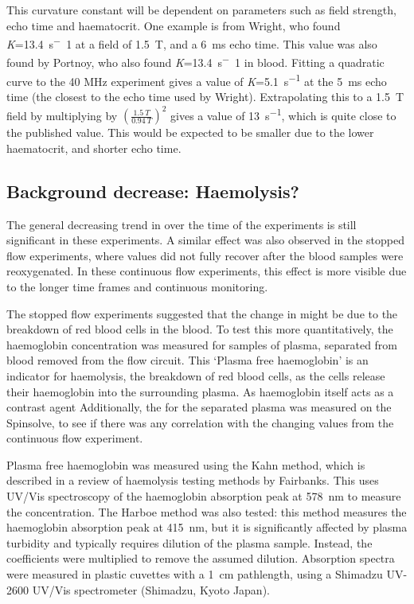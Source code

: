 This curvature constant will be dependent on parameters such as field strength, echo time and haematocrit.
One example is from Wright, who found \textit{K}=\SI{13.4}{s^-1} at a field of \SI{1.5}{T}, and a \SI{6}{ms} echo time\cite{WrightEstimatingoxygensaturation1991}.
This value was also found by Portnoy, who also found \textit{K}=\SI{13.4}{s^-1} in blood\cite{PortnoyRelaxationpropertieshuman2017}.
Fitting a quadratic curve to the 40 MHz experiment gives a value of \textit{K}=\SI{5.1}{s^{-1}} at the \SI{5}{ms} echo time (the closest to the echo time used by Wright).
Extrapolating this to a \SI{1.5}{T} field by multiplying by $(\frac{\SI{1.5}{T}}{\SI{0.94}{T}})^2$ gives a value of \SI{13}{s^{-1}}, which is quite close to the published value.
This would be expected to be smaller due to the lower haematocrit, and shorter echo time.


\subsection{Background \Ttwo decrease: Haemolysis?}

The general decreasing trend in \Ttwo over the time of the experiments is still significant in these experiments.
A similar effect was also observed in the stopped flow experiments, where \Ttwo values did not fully recover after the blood samples were reoxygenated.
In these continuous flow experiments, this effect is more visible due to the longer time frames and continuous monitoring.

The stopped flow experiments suggested that the change in \Ttwo might be due to the breakdown of red blood cells in the blood.
To test this more quantitatively, the haemoglobin concentration was measured for samples of plasma, separated from blood removed from the flow circuit.
This `Plasma free haemoglobin' is an indicator for haemolysis, the breakdown of red blood cells, as the cells release their haemoglobin into the surrounding plasma.
As haemoglobin itself acts as a contrast agent
Additionally, the \Ttwo for the separated plasma was measured on the Spinsolve, to see if there was any correlation with the changing \Ttwo values from the continuous flow experiment.

Plasma free haemoglobin was measured using the Kahn method, which is described in a review of haemolysis testing methods by Fairbanks\cite{FairbanksMethodsmeasuringplasma1992}.
This uses UV/Vis spectroscopy of the haemoglobin absorption peak at \SI{578}{nm} to measure the concentration.
The Harboe method was also tested: this method measures the haemoglobin absorption peak at \SI{415}{nm}, but it is significantly affected by plasma turbidity and typically requires dilution of the plasma sample.
Instead, the coefficients were multiplied to remove the assumed dilution.
Absorption spectra were measured in plastic cuvettes with a \SI{1}{cm} pathlength, using a Shimadzu UV-2600 UV/Vis spectrometer (Shimadzu, Kyoto Japan).

